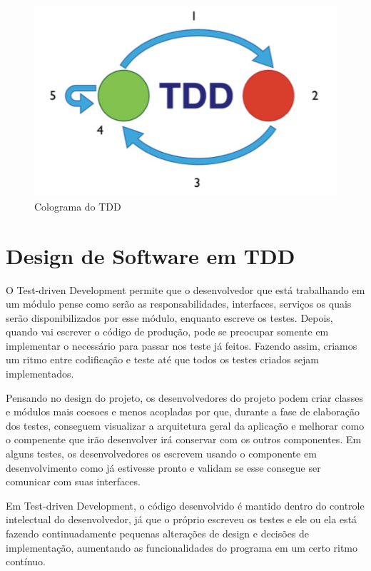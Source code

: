 \documentclass[12pt]{article}
\begin{document}
  \begin{figure}[H]
    \centering
    \includegraphics[scale=1.0]{tdd_micro}
    \caption{Colograma do TDD}
  \end{figure}

  \section{Design de Software em TDD}

  O Test-driven Development permite que o desenvolvedor que está trabalhando 
  em um módulo pense como serão as responsabilidades, interfaces, serviços os 
  quais serão disponibilizados por esse módulo, enquanto escreve os testes. 
  Depois, quando vai escrever o código de produção, pode se preocupar somente em
  implementar o necessário para passar nos teste já feitos. Fazendo assim, 
  criamos um ritmo entre codificação e teste até que todos os testes criados 
  sejam implementados.

  Pensando no design do projeto, os desenvolvedores do projeto podem criar
  classes e módulos mais coesoes e menos acopladas por que, durante a fase de 
  elaboração dos testes, conseguem visualizar a arquitetura geral da aplicação e
  melhorar como o compenente que irão desenvolver irá conservar com os outros 
  componentes. Em alguns testes, os desenvolvedores os escrevem usando o 
  componente em desenvolvimento como já estivesse pronto e validam se
  esse consegue ser comunicar com suas interfaces.

  Em Test-driven Development, o código desenvolvido é mantido dentro do controle
  intelectual do desenvolvedor, já que o próprio escreveu os testes e ele ou 
  ela está fazendo continuadamente pequenas alterações de design e decisões de 
  implementação, aumentando as funcionalidades do programa em um certo ritmo 
  contínuo.
\end{document}
